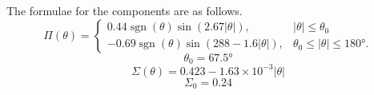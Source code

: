 The formulae for the components are as follows.
\begin{equation}\label{eqn:ss-first-formula}
\Pi(\theta) = 
\begin{cases}
0.44\operatorname{sgn}(\theta)\sin(2.67|\theta|),& |\theta| \leq \theta_0 \\
-0.69 \operatorname{sgn}(\theta)\sin(288-1.6|\theta|),& \theta_0\leq|\theta|\leq\ang{180}.
\end{cases}
\end{equation}
\begin{equation}\label{eqn:ss-second-formula}
\theta_0 = \ang{67.5}
\end{equation}
\begin{equation}\label{eqn:ss-third-formula}
\Sigma(\theta) = 0.423 - 1.63\times 10^{-3}|\theta|
\end{equation}
\begin{equation}\label{eqn:ss-last-formula}
\Sigma_0=0.24
\end{equation}


